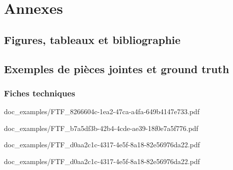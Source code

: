 \documentclass{report}
\begin{document}
\appendix
\part{Annexes}
    \chapter{Figures, tableaux et bibliographie}
        \listoftables
        \listoffigures
        
         
    \chapter{Exemples de pièces jointes et ground truth}
        \section{Fiches techniques}
        \label{ex:fiches_techniques}
        
                    {doc_examples/FTF_8266604c-1ea2-47ca-a4fa-649b4147e733.pdf}
%        

        
                    {doc_examples/FTF_b7a5df3b-42b4-4cde-ae39-18f0e7a5f776.pdf}
%        

        
                    {doc_examples/FTF_d0aa2c1c-4317-4e5f-8a18-82e56976da22.pdf}
        
                    {doc_examples/FTF_d0aa2c1c-4317-4e5f-8a18-82e56976da22.pdf}
\end{document}
